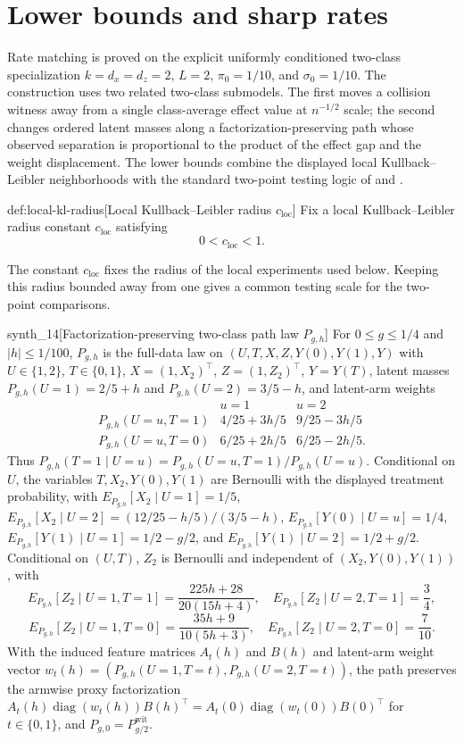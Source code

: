 \section{Lower bounds and sharp rates}

Rate matching is proved on the explicit uniformly conditioned two-class specialization \(k=d_x=d_z=2\), \(L=2\), \(\pi_0=1/10\), and \(\sigma_0=1/10\). The construction uses two related two-class submodels. The first moves a collision witness away from a single class-average effect value at \(n^{-1/2}\) scale; the second changes ordered latent masses along a factorization-preserving path whose observed separation is proportional to the product of the effect gap and the weight displacement. The lower bounds combine the displayed local Kullback--Leibler neighborhoods with the standard two-point testing logic of \citet{LeCam1986} and \citet{PolyanskiyWu2019}.

\begin{definitionv}{def:local-kl-radius}[Local Kullback--Leibler radius \(c_{\mathrm{loc}}\)]
Fix a local Kullback--Leibler radius constant \(c_{\mathrm{loc}}\) satisfying
\[
0<c_{\mathrm{loc}}<1.
\]
\end{definitionv}

The constant \(c_{\mathrm{loc}}\) fixes the radius of the local experiments used below. Keeping this radius bounded away from one gives a common testing scale for the two-point comparisons.

\begin{definitionv}{synth_14}[Factorization-preserving two-class path law $P_{g,h}$]
For $0\le g\le 1/4$ and $|h|\le 1/100$, $P_{g,h}$ is the full-data law on $(U,T,X,Z,Y(0),Y(1),Y)$ with $U\in\{1,2\}$, $T\in\{0,1\}$, $X=(1,X_2)^\top$, $Z=(1,Z_2)^\top$, $Y=Y(T)$, latent masses $P_{g,h}(U=1)=2/5+h$ and $P_{g,h}(U=2)=3/5-h$, and latent-arm weights\[\begin{array}{c|cc} & u=1 & u=2\\ \hline P_{g,h}(U=u,T=1) & 4/25+3h/5 & 9/25-3h/5\\ P_{g,h}(U=u,T=0) & 6/25+2h/5 & 6/25-2h/5 .\end{array}\] Thus $P_{g,h}(T=1\mid U=u)=P_{g,h}(U=u,T=1)/P_{g,h}(U=u)$. Conditional on $U$, the variables $T,X_2,Y(0),Y(1)$ are Bernoulli with the displayed treatment probability, with $E_{P_{g,h}}[X_2\mid U=1]=1/5$, $E_{P_{g,h}}[X_2\mid U=2]=(12/25-h/5)/(3/5-h)$, $E_{P_{g,h}}[Y(0)\mid U=u]=1/4$, $E_{P_{g,h}}[Y(1)\mid U=1]=1/2-g/2$, and $E_{P_{g,h}}[Y(1)\mid U=2]=1/2+g/2$. Conditional on $(U,T)$, $Z_2$ is Bernoulli and independent of $(X_2,Y(0),Y(1))$, with\[E_{P_{g,h}}[Z_2\mid U=1,T=1]=\frac{225h+28}{20(15h+4)},\quad E_{P_{g,h}}[Z_2\mid U=2,T=1]=\frac34,\]\[E_{P_{g,h}}[Z_2\mid U=1,T=0]=\frac{35h+9}{10(5h+3)},\quad E_{P_{g,h}}[Z_2\mid U=2,T=0]=\frac7{10}.\] With the induced feature matrices $A_t(h)$ and $B(h)$ and latent-arm weight vector $w_t(h)=(P_{g,h}(U=1,T=t),P_{g,h}(U=2,T=t))$, the path preserves the armwise proxy factorization $A_t(h)\operatorname{diag}(w_t(h))B(h)^\top=A_t(0)\operatorname{diag}(w_t(0))B(0)^\top$ for $t\in\{0,1\}$, and $P_{g,0}=P^{\mathrm{wit}}_{g/2}$.
\end{definitionv}

